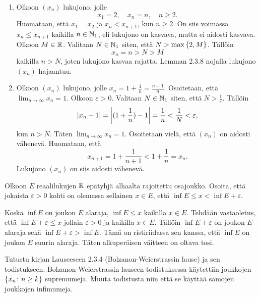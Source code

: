 \documentclass[11pt,a4paper]{amsart}
\begin{document}
\begin{solution}
\leavevmode\par
\begin{enumerate}[label=\alph*), nosep]
\item Olkoon \((x_n)\) lukujono, jolle
\[
x_1 = 2, \quad x_n = n, \quad n \geq 2.
\]
Huomataan, että \(x_1 = x_2\) ja \(x_n < x_{n + 1}\), kun \(n \geq 2\).
On siis voimassa \(x_n \leq x_{n + 1}\) kaikilla \(n \in \NNone\), eli
lukujono on kasvava, mutta ei aidosti kasvava. Olkoon \(M \in \RR\).
Valitaan \(N \in \NNone\) siten, että \(N > \maxset{2, M}\). Tällöin
\[
x_n = n > N > M
\]
kaikilla \(n > N\), joten lukujono kasvaa rajatta. Lemman 2.3.8 nojalla
lukujono \((x_n)\) hajaantuu.
\item Olkoon \((x_n)\) lukujono, jolle \(x_n = 1 + \frac{1}{n} =
\frac{n + 1}{n}\). Osoitetaan, että \(\lim_{n \to \infty} x_n = 1\).
Olkoon \(\varepsilon > 0\). Valitaan \(N \in \NNone\) siten, että
\(N > \frac{1}{\varepsilon}\). Tällöin
\[
\abs{x_n - 1} = \abs*{(1 + \frac{1}{n}) - 1} = \frac{1}{n} <
\frac{1}{N} < \varepsilon,
\]
kun \(n > N\). Täten \(\lim_{n \to \infty} x_n = 1\). Osoitetaan vielä, että
\((x_n)\) on aidosti vähenevä. Huomataan, että
\[
x_{n + 1} = 1 + \frac{1}{n + 1} < 1 + \frac{1}{n} = x_n.
\]
Lukujono \((x_n)\) on siis aidosti vähenevä.
\end{enumerate}
\end{solution}

\begin{exercise}
Olkoon \(E\) reaalilukujen \(\RR\) epätyhjä alhaalta rajoitettu osajoukko.
Osoita, että jokaista \(\varepsilon > 0\) kohti on olemassa sellainen \(x \in E\),
että \(\inf E \leq x < \inf E + \varepsilon\).
\end{exercise}

\begin{solution}
Koska \(\inf E\) on joukon \(E\) alaraja, \(\inf E \leq x\) kaikilla
\(x \in E\).
Tehdään vastaoletus, että \(\inf{E} + \varepsilon \leq x\) jollain
\(\varepsilon > 0\) ja kaikilla \(x \in E\). Tällöin \(\inf{E} + \varepsilon\)
on joukon \(E\) alaraja sekä \(\inf{E} + \varepsilon > \inf{E}\).
Tämä on ristiriidassa sen kanssa, että \(\inf{E}\) on joukon \(E\) suurin
alaraja. Täten alkuperäisen väitteen on oltava tosi.
\end{solution}

\begin{exercise}
Tutustu kirjan Lauseeseen 2.3.4 (Bolzanon-Weierstrassin lause) ja sen
todistukseen. Bolzanon-Weierstrassin lauseen todistuksessa käytettiin joukkojen
\(\set{x_n \colon n \geq k}\) supremumeja. Muuta todistusta niin että se käyttää
samojen joukkojen infimumeja.
\end{exercise}
\end{document}
